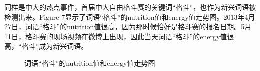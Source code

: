 \documentclass[a4paper]{article}
\begin{document}
\indent 同样是中大的热点事件，首届中大自由格斗赛的关键词“格斗”，也作为新兴词语被检测出来。Figure 7显示了词语“格斗”的nutrition值和energy值走势图。2013年4月27日，词语“格斗”的nutrition值很高，因为那时候恰好是格斗赛的报名日期。5月11日，格斗赛的现场视频在微博上出现，因此当天词语“格斗”的energy值很高，“格斗”成为新兴词语。
\begin{figure}[H]
\centering
{}
\caption{词语“格斗”的nutrition值和energy值走势图}
\label{fig:7}
\end{figure}
\end{document}
